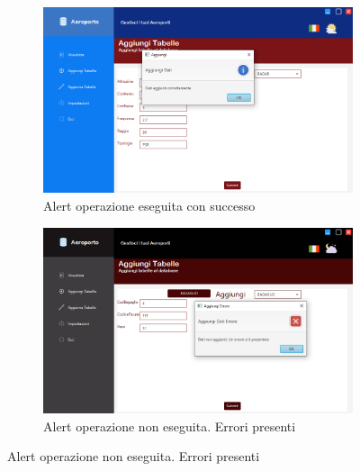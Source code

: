 \begin{figure}[ht]
	\begin{subfigure}{.6\textwidth}
		\centering
		\includegraphics[width=1\linewidth]{./img/Applicativo/add_table_alert_success.png}
		\caption{Alert operazione eseguita con successo}
		\label{fig:add_alert_success}
	\end{subfigure}%
	\begin{subfigure}{.6\textwidth}
		\centering
		\includegraphics[width=1\linewidth]{./img/Applicativo/add_table_alert_error.png}
		\caption{Alert operazione non eseguita. Errori presenti}
		\label{fig:add_alert_error}
	\end{subfigure}
	\label{fig:adds}
\end{figure}


\newpage

\enlargethispage{1\linewidth}

